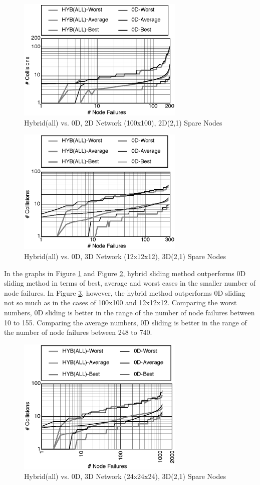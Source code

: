\documentclass[Afour,times,sagev]{sagej}
\begin{document}
\begin{figure}[ht]
\centering
\includegraphics[width=80mm]{Figs/100x100.eps}
  \caption{Hybrid(all) vs. 0D, 2D Network (100x100), 2D(2,1) Spare Nodes}
  \label{fig:100x100}
\end{figure}

\begin{figure}[ht]
\centering
\includegraphics[width=80mm]{Figs/12x12x12.eps}
  \caption{Hybrid(all) vs. 0D, 3D Network (12x12x12), 3D(2,1) Spare Nodes}
  \label{fig:12x12x12}
\end{figure}

In the graphs in Figure \ref{fig:100x100} and Figure
\ref{fig:12x12x12}, hybrid sliding method outperforms 0D sliding
method in terms of best, average and worst cases in the smaller number
of node failures. 
In Figure \ref{fig:24x24x24}, however, the hybrid method outperforms 0D
sliding not so much as in the cases of 100x100 and 12x12x12. Comparing
the worst numbers, 0D sliding is better in the range of the number of
node failures between 10 to 155. Comparing the 
average numbers, 0D sliding is better in the range of the number of
node failures between 248 to 740.

\begin{figure}[ht]
\centering
\includegraphics[width=80mm]{Figs/24x24x24.eps}
  \caption{Hybrid(all) vs. 0D, 3D Network (24x24x24), 3D(2,1)
    Spare Nodes}
  \label{fig:24x24x24}
\end{figure}
\end{document}
